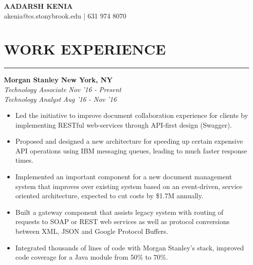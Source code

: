 \documentclass[12pt]{article}
\newcommand{\sectionHeading}[1]{
\vspace{-15pt}
\section*{\small{#1}}
\vspace{-10pt}
\hrule
\vspace{8pt}
}
\newcommand{\sectionHeadingWithLink}[2]{
\vspace{-15pt}
\section*{\small{#1 \textit{#2}}}
\vspace{-10pt}
\hrule
\vspace{8pt}
}
\newcommand{\experienceSectionSubheading}[6]{
  \vspace{-1pt}
    \small{\textbf{Morgan Stanley \hfill New York, NY}} \\
    \small{\textit{#3} \hfill \textit{#4}} \\
    \small{\textit{#5} \hfill \textit{#6}} \\
    \vspace{-20pt}
}
\newcommand {\projectSectionSubheading}[4]{
    \noindent \small{\textbf{#1} \textit{(#2)} : #3  \hfill \textit{#4}} \\
    \vspace{-10pt}
}
\newcommand{\sectionListStart}{
    \begin{itemize}[label={\small{\textbullet}}, leftmargin=20pt] %
}
\newcommand{\sectionListEnd}{\end{itemize} \vspace{0pt}}
\newcommand{\sectionListItem}[1]{\item \small{#1}}
\begin{document}
\begin{center}
\LARGE{\textbf{AADARSH KENIA}}\\
\vspace{4pt}
\small{\Letter \hspace{2mm}akenia@cs.stonybrook.edu} | \Telefon \hspace{2mm}631 974 8070 \\
\vspace{-10pt}
\end{center}

\sectionHeading{WORK EXPERIENCE}
\experienceSectionSubheading
{Morgan Stanley}{New York, NY}
{Technology Associate}{Nov '16 - Present}
{Technology Analyst}{Aug '16 - Nov '16}
\sectionListStart
    \sectionListItem
        Led the initiative to improve document collaboration experience for clients by implementing RESTful web-services through API-first design (Swagger).
    \sectionListItem
        Proposed and designed a new architecture for speeding up certain expensive API operations using IBM messaging queues, leading to much faster response times.
    
    \sectionListItem
        Implemented an important component for a new document management system that improves over existing system based on an event-driven, service oriented architecture, expected to cut costs by \$1.7M annually.
    
    \sectionListItem
        Built a gateway component that assists legacy system with routing of requests to SOAP or REST web services as well as protocol conversions between XML, JSON and Google Protocol Buffers.
    
    \sectionListItem
        Integrated thousands of lines of code with Morgan Stanley's  stack, improved code coverage for a Java module from 50\% to 70\%.
     
    
        
\sectionListEnd

\end{document}
